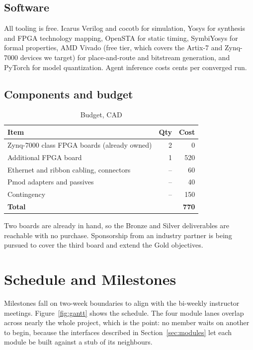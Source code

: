 \documentclass[conference,10pt]{IEEEtran}
\begin{document}
\subsection{Software}
All tooling is free. Icarus Verilog and cocotb for simulation, Yosys for synthesis
and FPGA technology mapping, OpenSTA for static timing, SymbiYosys for formal
properties, AMD Vivado (free tier, which covers the Artix-7 and Zynq-7000 devices
we target) for place-and-route and bitstream generation, and PyTorch for model
quantization. Agent inference costs cents per converged run.

\subsection{Components and budget}
\begin{table}[h]
\centering
\caption{Budget, CAD}
\begin{tabular}{@{}p{4.6cm}rr@{}}
\toprule
\textbf{Item} & \textbf{Qty} & \textbf{Cost} \\
\midrule
Zynq-7000 class FPGA boards (already owned) & 2 & 0 \\
Additional FPGA board & 1 & 520 \\
Ethernet and ribbon cabling, connectors & -- & 60 \\
Pmod adapters and passives & -- & 40 \\
Contingency & -- & 150 \\
\midrule
\textbf{Total} & & \textbf{770} \\
\bottomrule
\end{tabular}
\end{table}

Two boards are already in hand, so the Bronze and Silver deliverables are reachable
with no purchase. Sponsorship from an industry partner is being pursued to cover
the third board and extend the Gold objectives.

\section{Schedule and Milestones}
Milestones fall on two-week boundaries to align with the bi-weekly instructor
meetings. Figure~\ref{fig:gantt} shows the schedule. The four module lanes overlap
across nearly the whole project, which is the point: no member waits on another to
begin, because the interfaces described in Section~\ref{sec:modules} let each
module be built against a stub of its neighbours.
\end{document}

